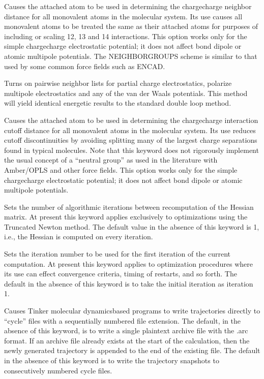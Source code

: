 \documentclass[letterpaper,11pt,english]{sphinxmanual}
\begin{document}
  Causes the attached atom to be used in determining the charge\sphinxhyphen{}charge neighbor distance for all monovalent atoms in the molecular system. Its use causes all monovalent atoms to be treated the same as their attached atoms for purposes of including or scaling 1\sphinxhyphen{}2, 1\sphinxhyphen{}3 and 1\sphinxhyphen{}4 interactions. This option works only for the simple charge\sphinxhyphen{}charge electrostatic potential; it does not affect bond dipole or atomic multipole potentials. The NEIGHBOR\sphinxhyphen{}GROUPS scheme is similar to that used by some common force fields such as ENCAD.

  Turns on pairwise neighbor lists for partial charge electrostatics, polarize multipole electrostatics and any of the van der Waals potentials. This method will yield identical energetic results to the standard double loop method.

  Causes the attached atom to be used in determining the charge\sphinxhyphen{}charge interaction cutoff distance for all monovalent atoms in the molecular system. Its use reduces cutoff discontinuities by avoiding splitting many of the largest charge separations found in typical molecules. Note that this keyword does not rigorously implement the usual concept of a “neutral group” as used in the literature with Amber/OPLS and other force fields. This option works only for the simple charge\sphinxhyphen{}charge electrostatic potential; it does not affect bond dipole or atomic multipole potentials.

  Sets the number of algorithmic iterations between recomputation of the Hessian matrix. At present this keyword applies exclusively to optimizations using the Truncated Newton method. The default value in the absence of this keyword is 1, i.e., the Hessian is computed on every iteration.

  Sets the iteration number to be used for the first iteration of the current computation. At present this keyword applies to optimization procedures where its use can effect convergence criteria, timing of restarts, and so forth. The default in the absence of this keyword is to take the initial iteration as iteration 1.

  Causes Tinker molecular dynamics\sphinxhyphen{}based programs to write trajectories directly to “cycle” files with a sequentially numbered file extension. The default, in the absence of this keyword, is to write a single plain\sphinxhyphen{}text archive file with the .arc format. If an archive file already exists at the start of the calculation, then the newly generated trajectory is appended to the end of the existing file. The default in the absence of this keyword is to write the trajectory snapshots to consecutively numbered cycle files.
\end{document}
